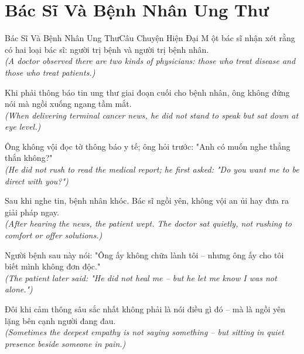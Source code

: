 \section{Bác Sĩ Và Bệnh Nhân Ung Thư}
\begin{truyen}{Bác Sĩ Và Bệnh Nhân Ung Thư}{Câu Chuyện Hiện Đại}
M ột bác sĩ nhận xét rằng có hai loại bác sĩ: người trị bệnh và người trị bệnh nhân.\\
\textit{(A doctor observed there are two kinds of physicians: those who treat disease and those who treat patients.)}

Khi phải thông báo tin ung thư giai đoạn cuối cho bệnh nhân, ông không đứng nói mà ngồi xuống ngang tầm mắt.\\
\textit{(When delivering terminal cancer news, he did not stand to speak but sat down at eye level.)}

Ông không vội đọc tờ thông báo y tế; ông hỏi trước: "Anh có muốn nghe thẳng thắn không?"\\
\textit{(He did not rush to read the medical report; he first asked: "Do you want me to be direct with you?")}

Sau khi nghe tin, bệnh nhân khóc. Bác sĩ ngồi yên, không vội an ủi hay đưa ra giải pháp ngay.\\
\textit{(After hearing the news, the patient wept. The doctor sat quietly, not rushing to comfort or offer solutions.)}

Người bệnh sau này nói: "Ông ấy không chữa lành tôi -- nhưng ông ấy cho tôi biết mình không đơn độc."\\
\textit{(The patient later said: "He did not heal me -- but he let me know I was not alone.")}

\end{truyen}
\begin{baihoc}
  Đôi khi cảm thông sâu sắc nhất không phải là nói điều gì đó -- mà là ngồi yên lặng bên cạnh người đang đau.\\
  \textit{(Sometimes the deepest empathy is not saying something -- but sitting in quiet presence beside someone in pain.)}
\end{baihoc}


